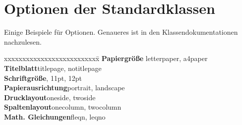 \section{Optionen der Standardklassen}
Einige Beispiele für Optionen. Genaueres ist in den Klassendokumentationen nachzulesen.
\begin{tabbing}
xxxxxxxxxxxxxxxxxxxxxxxxxx\=\kill
\textbf{Papiergröße}\> letterpaper, a4paper\\
\textbf{Titelblatt}\>titlepage, notitlepage\\
\textbf{Schriftgröße}\>10pt, 11pt, 12pt\\
\textbf{Papierausrichtung}\>portrait, landscape\\
\textbf{Drucklayout}\>oneside, twoside\\
\textbf{Spaltenlayout}\>onecolumn, twocolumn\\
\textbf{Math. Gleichungen}\>fleqn, leqno
\end{tabbing}

